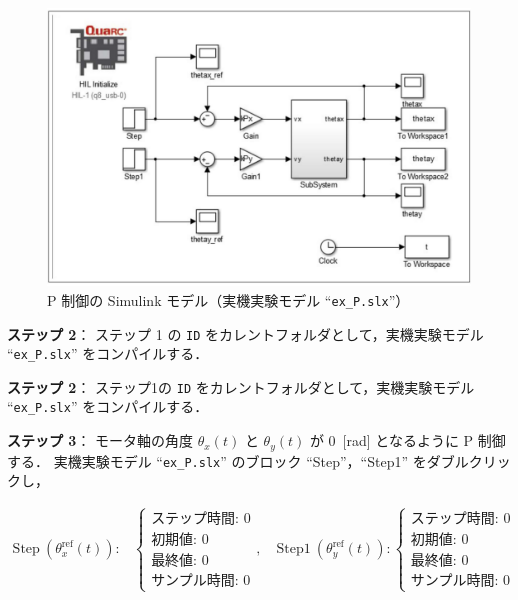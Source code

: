\begin{figure}[htbp]
    \centering
    \includegraphics[width=0.9\linewidth]{figure/step2_model.pdf}
    \caption{P 制御の Simulink モデル（実機実験モデル ``\texttt{ex\_P.slx}''）}
    \label{fig:simulink_model_p}
\end{figure}

\vspace{1em}
\noindent
\textbf{ステップ 2}：
ステップ 1 の \texttt{\textyen ID} をカレントフォルダとして，実機実験モデル ``\texttt{ex\_P.slx}'' をコンパイルする．

\vspace{1em}
\noindent
\textbf{ステップ 2}：
ステップ1の \texttt{\textyen ID} をカレントフォルダとして，実機実験モデル ``\texttt{ex\_P.slx}'' をコンパイルする．

\vspace{1em}
\noindent
\textbf{ステップ 3}：
モータ軸の角度 $\theta_x(t)$ と $\theta_y(t)$ が $0$~[rad] となるように P 制御する．
実機実験モデル ``\texttt{ex\_P.slx}'' のブロック ``Step''，``Step1'' をダブルクリックし，

\[
\begin{array}{ll}
\text{Step}~(\theta_x^{\mathrm{ref}}(t))\!: &
\left\{
\begin{array}{l}
\text{ステップ時間: } 0 \\
\text{初期値: } 0 \\
\text{最終値: } 0 \\
\text{サンプル時間: } 0
\end{array}
\right., \quad
\text{Step1}~(\theta_y^{\mathrm{ref}}(t))\!: 
\left\{
\begin{array}{l}
\text{ステップ時間: } 0 \\
\text{初期値: } 0 \\
\text{最終値: } 0 \\
\text{サンプル時間: } 0
\end{array}
\right.
\end{array}
\]

